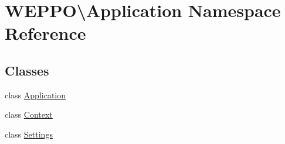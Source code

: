 \hypertarget{namespaceWEPPO_1_1Application}{}\section{W\+E\+P\+PO\textbackslash{}Application Namespace Reference}
\label{namespaceWEPPO_1_1Application}
\subsection*{Classes}
\begin{DoxyCompactItemize}
\item 
class \hyperlink{classWEPPO_1_1Application_1_1Application}{Application}
\item 
class \hyperlink{classWEPPO_1_1Application_1_1Context}{Context}
\item 
class \hyperlink{classWEPPO_1_1Application_1_1Settings}{Settings}
\end{DoxyCompactItemize}
